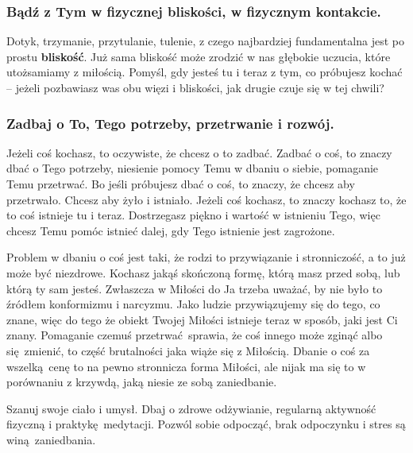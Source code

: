\subsubsection{Bądź z Tym w fizycznej bliskości, w fizycznym kontakcie.}
Dotyk, trzymanie, przytulanie, tulenie, z czego najbardziej fundamentalna jest po prostu \textbf{bliskość}.
Już sama bliskość może zrodzić w nas głębokie uczucia, które utożsamiamy z miłością.
Pomyśl, gdy jesteś tu i teraz z tym, co próbujesz kochać -- jeżeli pozbawiasz was obu więzi i bliskości, jak drugie czuje się w tej chwili?

\subsubsection{Zadbaj o To, Tego potrzeby, przetrwanie i rozwój.}
Jeżeli coś kochasz, to oczywiste, że chcesz o to zadbać.
Zadbać o coś, to znaczy dbać o Tego potrzeby, niesienie pomocy Temu w dbaniu o siebie, pomaganie Temu przetrwać.
Bo jeśli próbujesz dbać o coś, to znaczy, że chcesz aby przetrwało.
Chcesz aby żyło i istniało.
Jeżeli coś kochasz, to znaczy kochasz to, że to coś istnieje tu i teraz.
Dostrzegasz piękno i wartość w istnieniu Tego, więc chcesz Temu pomóc istnieć dalej, gdy Tego istnienie jest zagrożone.

Problem w dbaniu o coś jest taki, że rodzi to przywiązanie i stronniczość, a to już może być niezdrowe.
Kochasz jakąś skończoną formę, którą masz przed sobą, lub którą ty sam jesteś. 
Zwłaszcza w Miłości do Ja trzeba uważać, by nie było to źródłem konformizmu i narcyzmu.
Jako ludzie przywiązujemy się do tego, co znane, więc do tego że obiekt Twojej Miłości istnieje teraz w sposób, jaki jest Ci znany.
Pomaganie czemuś przetrwać sprawia, że coś innego może zginąć albo się zmienić, to część brutalności jaka wiąże się z Miłością.
Dbanie o coś za wszelką cenę to na pewno stronnicza forma Miłości, ale nijak ma się to w porównaniu z krzywdą, jaką niesie ze sobą zaniedbanie.

Szanuj swoje ciało i umysł. Dbaj o zdrowe odżywianie, regularną aktywność fizyczną i praktykę medytacji.
Pozwól sobie odpocząć, brak odpoczynku i stres są winą zaniedbania.

